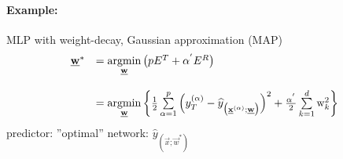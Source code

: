 \paragraph{Example:} MLP with weight-decay, Gaussian approximation (MAP)
\begin{equation}
	\begin{array}{ll}
	\vec{w}^*
	& = \argmin\limits_{\vec{w}} \big( p E^T + \alpha^{'} E^R \big) \\\\
	& = \argmin\limits_{\vec{w}} \bigg\{ \frac{1}{2} 
		\sum\limits_{\alpha = 1}^p \Big( y_T^{(\alpha)} - 
		\widehat{y}_{\big( \vec{x}^{(\alpha)}; \vec{w} \big)}
		\Big)^2 + \frac{\alpha^{'}}{2} \sum\limits_{k = 1}^d
		\mathrm{w}_k^2 \bigg\}
	\end{array}
\end{equation}
predictor: ''optimal'' network: $\widehat{y}_{(\vec{x};\vec{w}^*)}$

